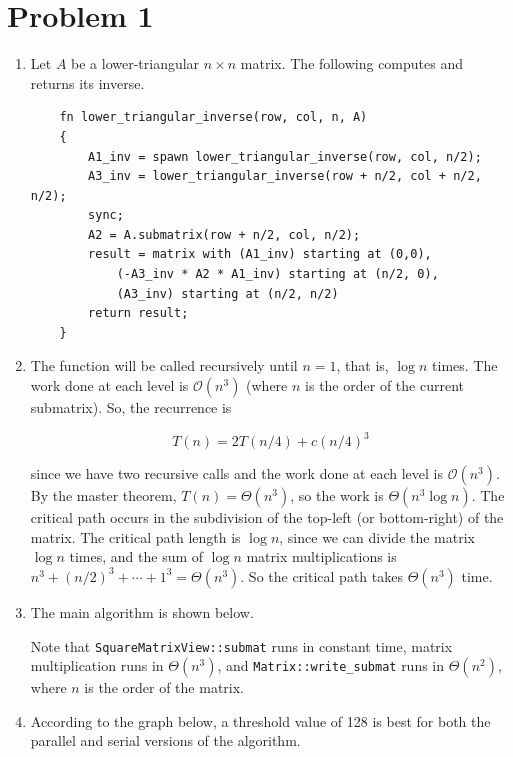 \documentclass[11pt, letterpaper]{article}
\begin{document}
\thispagestyle{firststyle}


\section*{Problem 1}

\begin{enumerate}
  \item Let $A$ be a lower-triangular $n \times n$ matrix. The following computes and returns its inverse.
  \begin{verbatim}
    fn lower_triangular_inverse(row, col, n, A)
    {
        A1_inv = spawn lower_triangular_inverse(row, col, n/2);
        A3_inv = lower_triangular_inverse(row + n/2, col + n/2, n/2);
        sync;
        A2 = A.submatrix(row + n/2, col, n/2); 
        result = matrix with (A1_inv) starting at (0,0),
            (-A3_inv * A2 * A1_inv) starting at (n/2, 0),
            (A3_inv) starting at (n/2, n/2)
        return result;
    } 
  \end{verbatim}

  \item The function will be called recursively until $n = 1$, that is, $\log n$ times. The work done at each level is $\mathcal O(n^3)$ (where $n$ is the order of the current submatrix). So, the recurrence is
  
  $$
  T(n) = 2T(n/4) + c(n/4)^3
  $$

  since we have two recursive calls and the work done at each level is $\mathcal O(n^3)$. By the master theorem, $T(n) = \Theta(n^3)$, so the work is $\Theta(n^3 \log n)$. The critical path occurs in the subdivision of the top-left (or bottom-right) of the matrix. The critical path length is $\log n$, since we can divide the matrix $\log n$ times, and the sum of $\log n$ matrix multiplications is $n^3 + (n/2)^3 + \cdots + 1^3 = \Theta(n^3)$. So the critical path takes $\Theta(n^3)$ time.

  \item The main algorithm is shown below.
  
  Note that \verb|SquareMatrixView::submat| runs in constant time, matrix multiplication runs in $\Theta(n^3)$, and \verb|Matrix::write_submat| runs in $\Theta(n^2)$, where $n$ is the order of the matrix.

  \item According to the graph below, a threshold value of 128 is best for both the parallel and serial versions of the algorithm.
  

\end{enumerate}
\end{document}
